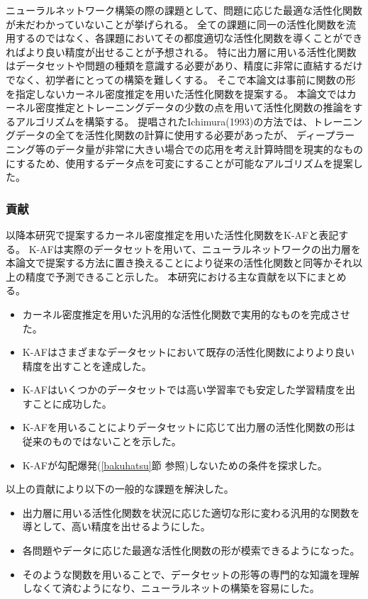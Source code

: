 ニューラルネットワーク構築の際の課題として、問題に応じた最適な活性化関数が未だわかっていないことが挙げられる。
全ての課題に同一の活性化関数を流用するのではなく、各課題においてその都度適切な活性化関数を導くことができればより良い精度が出せることが予想される。
特に出力層に用いる活性化関数はデータセットや問題の種類を意識する必要があり、精度に非常に直結するだけでなく、初学者にとっての構築を難しくする。
そこで本論文は事前に関数の形を指定しないカーネル密度推定を用いた活性化関数を提案する。
本論文ではカーネル密度推定とトレーニングデータの少数の点を用いて活性化関数の推論をするアルゴリズムを構築する。
提唱されたIchimura(1993)の方法では、トレーニングデータの全てを活性化関数の計算に使用する必要があったが、
ディープラーニング等のデータ量が非常に大きい場合での応用を考え計算時間を現実的なものにするため、使用するデータ点を可変にすることが可能なアルゴリズムを提案した。


\subsubsection{貢献}
\label{kouken}

以降本研究で提案するカーネル密度推定を用いた活性化関数をK-AFと表記する。
K-AFは実際のデータセットを用いて、ニューラルネットワークの出力層を本論文で提案する方法に置き換えることにより従来の活性化関数と同等かそれ以上の精度で予測できること示した。
本研究における主な貢献を以下にまとめる。

\begin{itemize}
  \item カーネル密度推定を用いた汎用的な活性化関数で実用的なものを完成させた。
  \item K-AFはさまざまなデータセットにおいて既存の活性化関数によりより良い精度を出すことを達成した。
  \item K-AFはいくつかのデータセットでは高い学習率でも安定した学習精度を出すことに成功した。
  \item K-AFを用いることによりデータセットに応じて出力層の活性化関数の形は従来のものではないことを示した。
  \item K-AFが勾配爆発(\ref{bakuhatsu}節 参照)しないための条件を探求した。
\end{itemize}

以上の貢献により以下の一般的な課題を解決した。

\begin{itemize}
  \item 出力層に用いる活性化関数を状況に応じた適切な形に変わる汎用的な関数を導として、高い精度を出せるようにした。
  \item 各問題やデータに応じた最適な活性化関数の形が模索できるようになった。
  \item そのような関数を用いることで、データセットの形等の専門的な知識を理解しなくて済むようになり、ニューラルネットの構築を容易にした。
\end{itemize}



